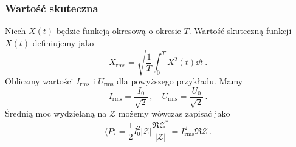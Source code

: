 \documentclass[../main.tex]{subfiles}
\begin{document}
\subsubsection*{Wartość skuteczna}
Niech \(X(t)\) będzie funkcją okresową o okresie \(T\). Wartość skuteczną funkcji \(X(t)\)
definiujemy jako
\begin{equation*}
    X_\text{rms}=\sqrt{\frac{1}{T}\int_0^{T}X^2(t)\dd{t}}\,.
\end{equation*}
Obliczmy wartości \(I_\text{rms}\) i \(U_\text{rms}\) dla powyższego przykładu. Mamy
\begin{equation*}
    I_\text{rms}=\frac{I_0}{\sqrt{2}}\,,\quad U_\text{rms}=\frac{U_0}{\sqrt{2}}\,.
\end{equation*}
Średnią moc wydzielaną na \(\mathcal{Z}\) możemy wówczas zapisać jako
\begin{equation*}
    \langle P\rangle=\frac{1}{2}I_0^2|\mathcal{Z}|\frac{\Re{\mathcal{Z}^*}}{|\mathcal{Z}|}=I_\text{rms}^2\Re{\mathcal{Z}}\,.
\end{equation*}
\end{document}
